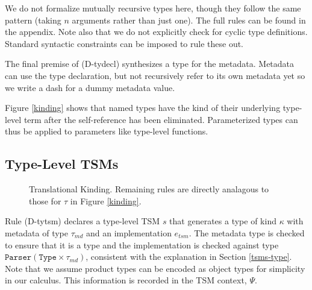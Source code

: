 \documentclass{sig-alternate}
\newcommand{\flyingbox}[1]{\fbox{{#1}}}
\newcommand{\mycaption}[1]{\vspace{-4px}\caption{#1}\vspace{-2px}}
\begin{document}
We do not formalize mutually recursive types here, though they follow the same pattern (taking $n$ arguments rather than just one). The full rules can be found in the appendix. Note also that we do not explicitly check for cyclic type definitions. Standard syntactic constraints can be imposed to rule these out. 

The final premise of (D-tydecl) synthesizes a type for the metadata. Metadata can use  the type declaration, but not recursively refer to its own metadata yet so we write a dash for a dummy metadata value.

Figure \ref{kinding} shows that named types have the kind of their underlying type-level term after the self-reference has been eliminated. Parameterized types can thus be applied to parameters like type-level functions.

\subsection{Type-Level TSMs}

\begin{figure}[t]
\flyingbox{$\Delta;\Delta\vdash_{\Theta}\hat{\tau}\rightsquigarrow \tau::\kappa$}
\vspace{-6px}
\begin{center}
\noLine
\BIC{}
\DP
\end{center}
\begin{center}
\DP
\end{center}
\mycaption{Translational Kinding. Remaining rules are directly analagous to those for $\tau$ in Figure \ref{kinding}.}
\label{tr-kinding}
\end{figure}
Rule (D-tytsm) declares a type-level TSM $s$ that generates a type of kind $\kappa$ with metadata of type $\tau_{md}$ and an implementation $e_{tsm}$. The metadata type is checked to ensure that it is a type and the implementation is checked against type $\mathtt{Parser}(\mathtt{Type} \times \tau_{md})$, consistent with the explanation in Section \ref{tsms-type}. Note that we assume product types can be encoded as object types for simplicity in our calculus. This information is recorded in the TSM context, $\Psi$.
\end{document}
